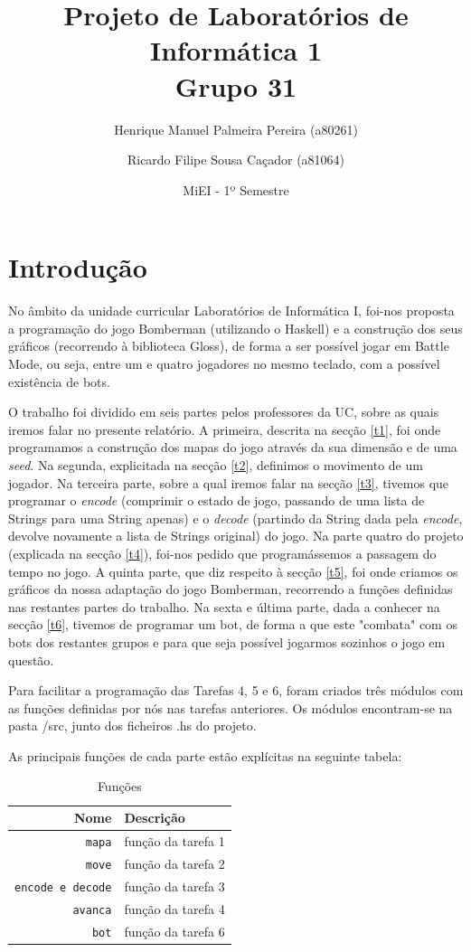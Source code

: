 \documentclass[a4paper]{article}
\title{Projeto de Laboratórios de Informática 1\\Grupo 31}
\author{Henrique Manuel Palmeira Pereira (a80261) \and Ricardo Filipe Sousa Caçador (a81064)}
\date{MiEI - 1º Semestre}
\begin{document}
\maketitle

\tableofcontents

\section{Introdução}
No âmbito da unidade curricular Laboratórios de Informática I, foi-nos proposta a programação do jogo Bomberman (utilizando o Haskell) e a construção dos seus gráficos (recorrendo à biblioteca Gloss), de forma a ser possível jogar em Battle Mode, ou seja, entre um e quatro jogadores no mesmo teclado, com a possível existência de bots.

O trabalho foi dividido em seis partes pelos professores da UC, sobre as quais iremos falar no presente relatório. A primeira, descrita na secção \ref{t1}, foi onde programamos a construção dos mapas do jogo através da sua dimensão e de uma \textit{seed}. Na segunda, explicitada na secção \ref{t2}, definimos o movimento de um jogador. Na terceira parte, sobre a qual iremos falar na secção \ref{t3}, tivemos que programar o \textit{encode} (comprimir o estado de jogo, passando de uma lista de Strings para uma String apenas) e o \textit{decode} (partindo da String dada pela \textit{encode}, devolve novamente a lista de Strings original) do jogo. Na parte quatro do projeto (explicada na secção \ref{t4}), foi-nos pedido que programássemos a passagem do tempo no jogo. A quinta parte, que diz respeito à secção \ref{t5}, foi onde criamos os gráficos da nossa adaptação do jogo Bomberman, recorrendo a funções definidas nas restantes partes do trabalho. Na sexta e última parte, dada a conhecer na secção \ref{t6}, tivemos de programar um bot, de forma a que este "combata" com os bots dos restantes grupos e para que seja possível jogarmos sozinhos o jogo em questão.

Para facilitar a programação das Tarefas 4, 5 e 6, foram criados três módulos com as funções definidas por nós nas tarefas anteriores. Os módulos encontram-se na pasta /src, junto dos ficheiros .hs do projeto.

As principais funções de cada parte estão explícitas na seguinte tabela:

\begin{table}[h]
	\centering
\begin{tabular}{|r|l|}
	\hline
	\textbf{Nome} & \textbf{Descrição} \\ \hline
	\texttt{mapa} & função da tarefa 1 \\ \hline
	\texttt{move} & função da tarefa 2 \\ \hline
	\texttt{encode e decode} & função da tarefa 3 \\ \hline
	\texttt{avanca} & função da tarefa 4 \\ \hline
	\texttt{bot} & função da tarefa 6 \\ \hline
\end{tabular}
\caption{Funções}
\end{table}
\label{tb1}
\end{document}
